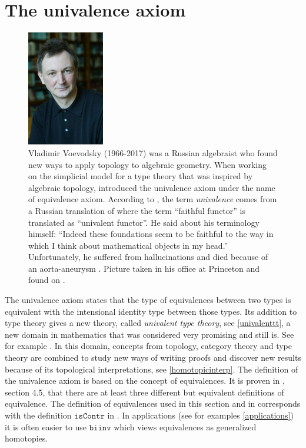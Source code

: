 \documentclass[12pt,a4paper,twoside,xetex]{book} %
\newcommand{\keyword}[1]{\emph{#1}\index{#1}}
\newcommand{\op}[1]{\mathtt{#1}}
\begin{document}
\section{The univalence axiom}

\begin{figure}
\begin{center}
\includegraphics[width=0.3\textwidth]{figures/Voevodsky}
\par\end{center}
\caption{\label{fig:Vladimir-Voevodsky-1966-2017}
  Vladimir Voevodsky (1966-2017)  was a Russian
algebraist who found new ways to apply topology to algebraic geometry. When 
working on the simplicial model for a type theory that was inspired by 
algebraic topology, \cite{Voevodsky2010a} introduced the univalence axiom under 
the name of equivalence axiom. According to \cite{Voevodsky2014}, the term \keyword{univalence} comes from a 
Russian translation of \cite{Boardman2006} where  the term
\textquotedblleft faithful functor\textquotedblright{} is translated
as \textquotedblleft univalent functor\textquotedblright . He said about his terminology himself: ``Indeed these foundations seem 
to be faithful to the way in which I think about mathematical objects in my 
head.''
 Unfortunately, he suffered from hallucinations \cite{Baez2017} and died 
because of an aorta-aneurysm \cite{Rehmeyer2017}. Picture taken in his office at Princeton and found on \cite{Grayson2017}.}
\end{figure}

The univalence axiom states that the type of equivalences between two types is 
equivalent with the intensional identity type between those types. Its addition 
to type theory gives a new theory, called \keyword{univalent type theory}, see 
\cref{univalenttt}, a new domain in mathematics that was considered very 
promising and still is. See for example \cite{shulman_2018}. In this domain, concepts from topology, category theory 
and type theory  are combined to study new ways of writing proofs and discover 
new results because of its topological interpretations, see 
\cref{homotopicinterp}. The definition of the univalence axiom is based on the 
concept of equivalences. It is proven in \cite{Voevodsky2013}, section 4.5, 
that there are at least three different but equivalent definitions of 
equivalence. The definition of equivalences used in this section and in 
\cite{Pelayo2014} corresponds with the definition $\op{isContr}$ in 
\cite{Voevodsky2013}. In applications (see for examples \cref{applications}) it 
is often easier to use $\op{biinv}$ which views equivalences as
generalized homotopies.
\end{document}
